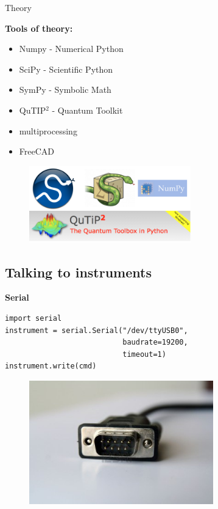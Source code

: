 \documentclass{beamer}
\begin{document}
\begin{frame}{Theory}

\textbf{Tools of theory:}

\begin{itemize}
	\item Numpy - Numerical Python
	\item SciPy - Scientific Python
	\item SymPy - Symbolic Math
	\item QuTIP$^2$ - Quantum Toolkit
	\item multiprocessing
	\item FreeCAD
\end{itemize}

\begin{figure}[ht]
	\includegraphics[width=7cm]{numerical.png}
\end{figure}

\end{frame}


\subsection{Talking to instruments}

%
%
%

\begin{frame}[fragile]

\textbf{Serial}

\begin{verbatim}
import serial
instrument = serial.Serial("/dev/ttyUSB0",
                           baudrate=19200,
                           timeout=1)
instrument.write(cmd)
\end{verbatim}

\begin{figure}[ht]
	\includegraphics[width=8cm]{serial-connector.jpg}
\end{figure}
     
\end{frame}
\end{document}
